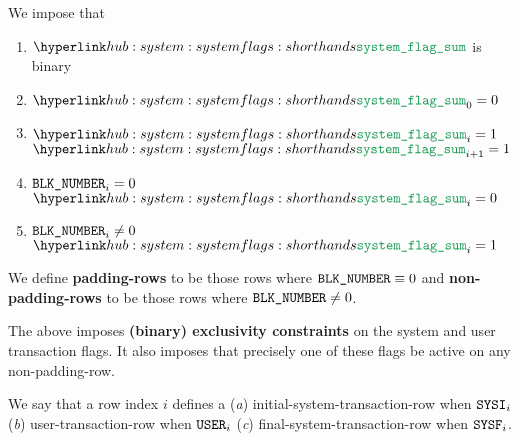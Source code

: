We impose that
\begin{enumerate}
	\item $\flagSum$ is binary
	\item $\flagSum _{0} = 0$
	\item \If $\flagSum _{i} = 1$ \Then $\flagSum _{i + 1} = 1$
	\item \If $\texttt{BLK\_NUMBER} _{i} =    0$ \Then $\flagSum _{i} = 0$
	\item \If $\texttt{BLK\_NUMBER} _{i} \neq 0$ \Then $\flagSum _{i} = 1$
\end{enumerate}
\saNote{} \label{hub: system: padding row definition}
We define \textbf{padding-rows} to be those rows where $\texttt{BLK\_NUMBER} \equiv 0$ and
\textbf{non-padding-rows} to be those rows where $\texttt{BLK\_NUMBER} \neq 0$.

\saNote{} \label{hub: system: exclusivity of the system and user transaction flags}
The above imposes \textbf{(binary) exclusivity constraints} on the system and user transaction flags.
It also imposes that precisely one of these flags be active on any non-padding-row.

\saNote{} \label{hub: system: flags: user and system transaction rows}
We say that a row index $i$ defines a
(\emph{a}) initial-system-transaction-row when $\texttt{SYSI} _{i}$
(\emph{b}) user-transaction-row           when $\texttt{USER} _{i}$
(\emph{c}) final-system-transaction-row   when $\texttt{SYSF} _{i}$.
